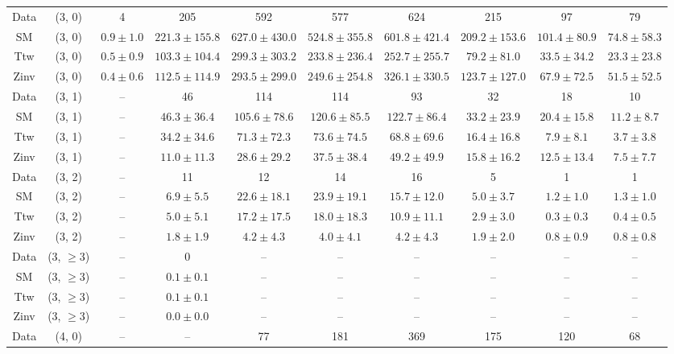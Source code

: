 \begin{table}[h!]
{\begin{tabular}{cccccccccc}
	Data & (3, 0) & 4 & 205 & 592 & 577 & 624 & 215 & 97 & 79 \\[0.5ex] 
	SM & (3, 0) & $0.9\pm 1.0$ & $221.3\pm 155.8$ & $627.0\pm 430.0$ & $524.8\pm 355.8$ & $601.8\pm 421.4$ & $209.2\pm 153.6$ & $101.4\pm 80.9$ & $74.8\pm 58.3$ \\[0.5ex] 
	Ttw & (3, 0) & $0.5\pm 0.9$ & $103.3\pm 104.4$ & $299.3\pm 303.2$ & $233.8\pm 236.4$ & $252.7\pm 255.7$ & $79.2\pm 81.0$ & $33.5\pm 34.2$ & $23.3\pm 23.8$ \\[0.5ex] 
	Zinv & (3, 0) & $0.4\pm 0.6$ & $112.5\pm 114.9$ & $293.5\pm 299.0$ & $249.6\pm 254.8$ & $326.1\pm 330.5$ & $123.7\pm 127.0$ & $67.9\pm 72.5$ & $51.5\pm 52.5$ \\[0.5ex] 
	Data & (3, 1) & -- & 46 & 114 & 114 & 93 & 32 & 18 & 10 \\[0.5ex] 
	SM & (3, 1) & -- & $46.3\pm 36.4$ & $105.6\pm 78.6$ & $120.6\pm 85.5$ & $122.7\pm 86.4$ & $33.2\pm 23.9$ & $20.4\pm 15.8$ & $11.2\pm 8.7$ \\[0.5ex] 
	Ttw & (3, 1) & -- & $34.2\pm 34.6$ & $71.3\pm 72.3$ & $73.6\pm 74.5$ & $68.8\pm 69.6$ & $16.4\pm 16.8$ & $7.9\pm 8.1$ & $3.7\pm 3.8$ \\[0.5ex] 
	Zinv & (3, 1) & -- & $11.0\pm 11.3$ & $28.6\pm 29.2$ & $37.5\pm 38.4$ & $49.2\pm 49.9$ & $15.8\pm 16.2$ & $12.5\pm 13.4$ & $7.5\pm 7.7$ \\[0.5ex] 
	Data & (3, 2) & -- & 11 & 12 & 14 & 16 & 5 & 1 & 1 \\[0.5ex] 
	SM & (3, 2) & -- & $6.9\pm 5.5$ & $22.6\pm 18.1$ & $23.9\pm 19.1$ & $15.7\pm 12.0$ & $5.0\pm 3.7$ & $1.2\pm 1.0$ & $1.3\pm 1.0$ \\[0.5ex] 
	Ttw & (3, 2) & -- & $5.0\pm 5.1$ & $17.2\pm 17.5$ & $18.0\pm 18.3$ & $10.9\pm 11.1$ & $2.9\pm 3.0$ & $0.3\pm 0.3$ & $0.4\pm 0.5$ \\[0.5ex] 
	Zinv & (3, 2) & -- & $1.8\pm 1.9$ & $4.2\pm 4.3$ & $4.0\pm 4.1$ & $4.2\pm 4.3$ & $1.9\pm 2.0$ & $0.8\pm 0.9$ & $0.8\pm 0.8$ \\[0.5ex] 
	Data & (3, $\ge3$) & -- & 0 & -- & -- & -- & -- & -- & -- \\[0.5ex] 
	SM & (3, $\ge3$) & -- & $0.1\pm 0.1$ & -- & -- & -- & -- & -- & -- \\[0.5ex] 
	Ttw & (3, $\ge3$) & -- & $0.1\pm 0.1$ & -- & -- & -- & -- & -- & -- \\[0.5ex] 
	Zinv & (3, $\ge3$) & -- & $0.0\pm 0.0$ & -- & -- & -- & -- & -- & -- \\[0.5ex] 
	Data & (4, 0) & -- & -- & 77 & 181 & 369 & 175 & 120 & 68 \\[0.5ex] 

\end{tabular}}
\end{table}
